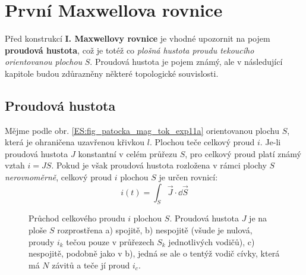     \section{První Maxwellova rovnice}\label{ES:sec07}
      Před konstrukcí \textbf{I. Maxwellovy rovnice} je vhodné upozornit na pojem \textbf{proudová 
      hustota}, což je totéž co \emph{plošná hustota proudu tekoucího orientovanou plochou} \(S\). 
      Proudová hustota je pojem známý, ale v následující kapitole budou zdůrazněny některé 
      topologické souvislosti.
      
      \subsection{Proudová hustota}
        Mějme podle obr. \ref{ES:fig_patocka_mag_tok_exp11a} orientovanou plochu \(S\), která je 
        ohraničena uzavřenou křivkou \(l\). Plochou teče celkový proud \(i\). Je-li proudová 
        hustota \(J\) konstantní v celém průřezu \(S\), pro celkový proud platí známý vztah \(i = 
        JS\). Pokud je však proudová hustota rozložena v rámci plochy \(S\) \emph{nerovnoměrně}, 
        celkový proud \(i\) plochou \(S\) je určen rovnicí:
        \begin{equation}\label{ES:eq_zakl_elm39}
          i(t) = \int_S\vec{J}\cdot \dd{\vec{S}}
        \end{equation}         
        \begin{figure}[ht!]
          \centering  
          \caption{Průchod celkového proudu \(i\) plochou \(S\). Proudová hustota \(J\) je na 
                   ploše \(S\) rozprostřena a) spojitě, b) nespojitě (všude je nulová, proudy 
                   \(i_k\) tečou pouze v průřezech \(S_k\) jednotlivých vodičů), c) nespojitě, 
                   podobně jako v b), jedná se ale o tentýž vodič cívky, která má \(N\) závitů a 
                   teče jí proud \(i_c\).} 
          \label{ES:fig_patocka_mag_tok_exp11}
        \end{figure}
      
